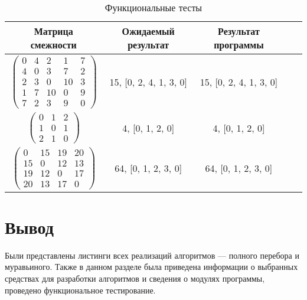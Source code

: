 \begin{center}
	\captionsetup{justification=raggedright,singlelinecheck=off}
	\begin{longtable}[c]{|c|c|c|c|c|}
		\caption{Функциональные тесты\label{tbl:functional_test}} \\ \hline
		Матрица смежности & Ожидаемый результат & Результат программы \\
		\hline
		$ \begin{pmatrix}
			0 &  4 &  2 &  1 & 7 \\
			4 &  0 &  3 &  7 & 2 \\
			2 &  3 &  0 & 10 & 3 \\
			1 &  7 & 10 &  0 & 9 \\
			7 &  2 &  3 &  9 & 0
		\end{pmatrix}$ &
		15, [0, 2, 4, 1, 3, 0] &
		15, [0, 2, 4, 1, 3, 0] \\
		
		$ \begin{pmatrix}
			0 & 1 & 2 \\
			1 & 0 & 1 \\
			2 & 1 & 0	
		\end{pmatrix}$ &
		4, [0, 1, 2, 0] &
		4, [0, 1, 2, 0] \\
		
		$ \begin{pmatrix}
			0 & 15 & 19 & 20 \\
			15 &  0 & 12 & 13 \\
			19 & 12 &  0 & 17 \\
			20 & 13 & 17 &  0
		\end{pmatrix}$ &
		64, [0, 1, 2, 3, 0] &
		64, [0, 1, 2, 3, 0] \\
		\hline
	\end{longtable}
\end{center}

\section*{Вывод}

Были представлены листинги всех реализаций алгоритмов --- полного перебора и муравьиного. Также в данном разделе была приведена информации о выбранных средствах для разработки алгоритмов и сведения о модулях программы, проведено функциональное тестирование.
